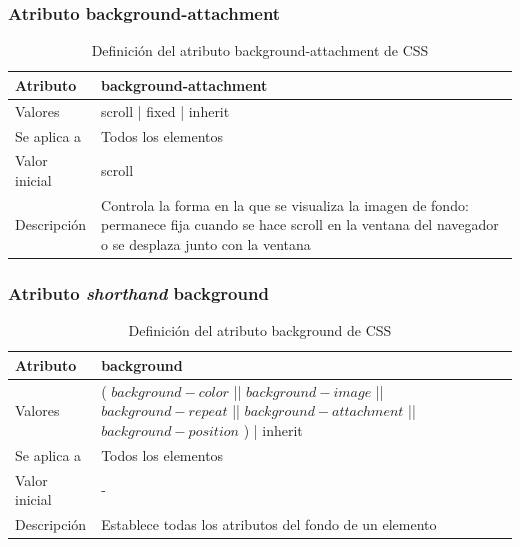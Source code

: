 \documentclass[ucs]{beamer}
\begin{document}
\begin{frame}
\frametitle{Atributo background-attachment}

\begin{center}
  \begin{table}
   \begin{tabular}{p{1.8cm}p{7.8cm}}
Atributo & \bf{background-attachment} \\ \hline
Valores& scroll | fixed | inherit \\ \hline
Se aplica a& Todos los elementos \\ \hline
Valor inicial& scroll \\ \hline
Descripción& Controla la forma en la que se visualiza la imagen de fondo: permanece fija cuando se hace scroll en la ventana del navegador o se desplaza junto con la ventana \\ \hline
  \end{tabular}
   \caption{Definición del atributo background-attachment de CSS}
 \end{table}
\end{center}


\end{frame}



\begin{frame}
\frametitle{Atributo \emph{shorthand} background}

\begin{center}
  \begin{table}
   \begin{tabular}{p{1.8cm}p{7.8cm}}
Atributo & \bf{background} \\ \hline
Valores& ( $background-color$ || $background-image$ || $background-repeat$ || $background-attachment$ || $background-position$ ) | inherit \\ \hline
Se aplica a& Todos los elementos \\ \hline
Valor inicial& - \\ \hline
Descripción& Establece todas los atributos del fondo de un elemento \\ \hline
  \end{tabular}
   \caption{Definición del atributo background de CSS}
 \end{table}
\end{center}


\end{frame}
\end{document}
